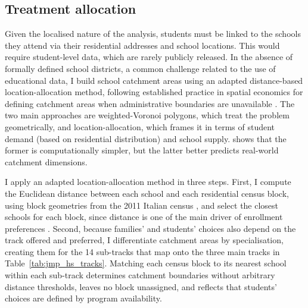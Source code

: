 \documentclass[12pt]{article}
\theoremstyle{plain}
\theoremstyle{plain}
\theoremstyle{plain}
\theoremstyle{definition}
\theoremstyle{plain}
\theoremstyle{definition}
\theoremstyle{plain}
\theoremstyle{remark}
\theoremstyle{definition}
\theoremstyle{definition}
\theoremstyle{plain}
\begin{document}
\subsection{Treatment allocation}
\vspace{-0.19cm}
\label{sec:jmp_treatment}
Given the localised nature of the analysis, students must be linked to the schools they attend via their residential addresses and school locations. This would require student-level data, which are rarely publicly released. In the absence of formally defined school districts, a common challenge related to the use of educational data, I build school catchment areas using an adapted distance-based location-allocation method, following established practice in spatial economics for defining catchment areas when administrative boundaries are unavailable \citep{pearce_techniques_2000, singleton_estimating_2011}. The two main approaches are weighted-Voronoi polygons, which treat the problem geometrically, and location-allocation, which frames it in terms of student demand (based on residential distribution) and school supply. \citet{pearce_techniques_2000} shows that the former is computationally simpler, but the latter better predicts real-world catchment dimensions. \par
I apply an adapted location-allocation method in three steps. First, I compute the Euclidean distance between each school and each residential census block, using block geometries from the 2011 Italian census \citep{istat_censimento_2011}, and select the closest schools for each block, since distance is one of the main driver of enrollment preferences \citep{mandic_enrolling_2017}. Second, because families' and students' choices also depend on the track offered and preferred, I differentiate catchment areas by specialisation, creating them for the 14 sub-tracks that map onto the three main tracks in Table~\ref{tab:jmp_hs_tracks}. Matching each census block to its nearest school within each sub-track determines catchment boundaries without arbitrary distance thresholds, leaves no block unassigned, and reflects that students' choices are defined by program availability. \par
\end{document}
